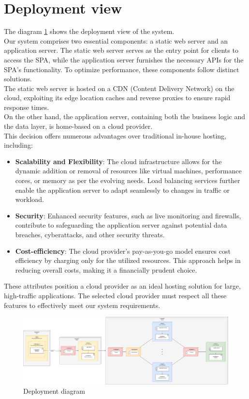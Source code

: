 \section{Deployment view}
The diagram \ref{fig:deployment_diagram} shows the deployment view of the system.\\
Our system comprises two essential components: a static web server and an application server. 
The static web server serves as the entry point for clients to access the SPA, while the application server furnishes the necessary APIs for the SPA's functionality. 
To optimize performance, these components follow distinct solutions.\\
The static web server is hosted on a CDN (Content Delivery Network) on the cloud, exploiting its edge location caches and reverse proxies to ensure rapid response times. \\
On the other hand, the application server, containing both the business logic and the data layer, is home-based on a cloud provider. \\
This decision offers numerous advantages over traditional in-house hosting, including:
\begin{itemize}
    \item \textbf{Scalability and Flexibility}: The cloud infrastructure allows for the dynamic addition or removal of resources like virtual machines, performance cores, or memory as per the evolving needs. Load balancing services further enable the application server to adapt seamlessly to changes in traffic or workload.
    \item \textbf{Security}: Enhanced security features, such as live monitoring and firewalls, contribute to safeguarding the application server against potential data breaches, cyberattacks, and other security threats.
    \item \textbf{Cost-efficiency}: The cloud provider's pay-as-you-go model ensures cost efficiency by charging only for the utilized resources. This approach helps in reducing overall costs, making it a financially prudent choice.
\end{itemize}
These attributes position a cloud provider as an ideal hosting solution for large, high-traffic applications. 
The selected cloud provider must respect all these features to effectively meet our system requirements.

\begin{figure}[ht]
    \centering
    \includegraphics[width=\textwidth]{images/diagrams/deployment_view.png}
    \caption{Deployment diagram}
    \label{fig:deployment_diagram}
\end{figure}

